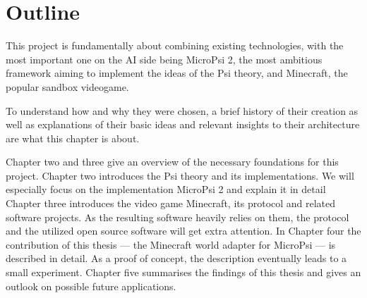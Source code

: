 \section{Outline}
This project is fundamentally about combining existing technologies, with the most important one on the AI side being MicroPsi 2, the most ambitious framework aiming to implement the ideas of the Psi theory, and Minecraft, the popular sandbox videogame.

To understand how and why they were chosen, a brief history of their creation as well as explanations of their basic ideas and relevant insights to their architecture are what this chapter is about.

Chapter two and three give an overview of the necessary foundations for this project. Chapter two introduces the Psi theory and its implementations. We will especially focus on the implementation MicroPsi 2 and explain it in detail Chapter three introduces the video game Minecraft, its protocol and related software projects. As the resulting software heavily relies on them, the protocol and the utilized open source software will get extra attention. 
In Chapter four the contribution of this thesis --- the Minecraft world adapter for MicroPsi --- is described in detail. As a proof of concept, the description eventually leads to a small experiment.
Chapter five summarises the findings of this thesis and gives an outlook on possible future applications.